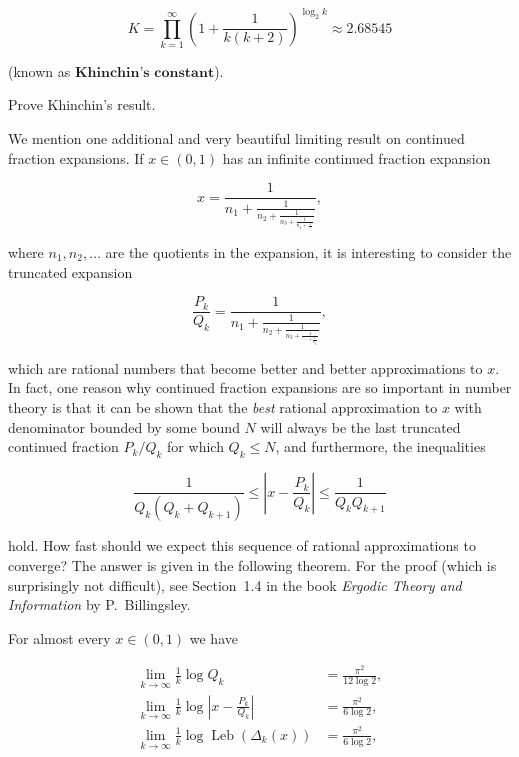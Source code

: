 \begin{enumerate}[label=\arabic*.]
\[
K = \prod_{k=1}^\infty \left( 1+\frac{1}{k(k+2)} \right)^{\log_2 k} \approx 2.68545
\]

\noindent (known as $\textbf{Khinchin's constant}$).

\begin{xexercise}
Prove Khinchin's result.
\end{xexercise}

\noindent We mention one additional and very beautiful limiting
result on continued fraction expansions. If
$x\in (0,1)$ has an infinite continued fraction
expansion

\[
x = \frac{1}{n_1+\frac{1}{n_2+\frac{1}{n_3+\frac{1}{n_4+\frac{1}{\ldots}}}}},
\]

\noindent where $n_1,n_2,\ldots$ are the quotients in the
expansion, it is interesting to consider the truncated
expansion

\[
\frac{P_k}{Q_k} = \frac{1}{n_1+\frac{1}{n_2+\frac{1}{n_3+\frac{1}{\ddots+\frac{1}{n_k}}}}},
\]

\noindent which are rational numbers that become better and
better approximations to $x$. In fact, one reason why
continued fraction expansions are so important in
number theory is that it can be shown that the \emph{best}
rational approximation to $x$ with denominator
bounded by some bound $N$ will always be the last
truncated continued fraction $P_k/Q_k$ for which
$Q_k\le N$, and furthermore, the inequalities

\begin{equation*} \tag{22}\label{eq:cont-frac-approx}
\frac{1}{Q_k (Q_k+Q_{k+1})} \le \left|x - \frac{P_k}{Q_k} \right| \le \frac{1}{Q_k Q_{k+1}}
\end{equation*}

\noindent hold. How fast should we expect this sequence of
rational approximations to converge? The answer is
given in the following theorem. For the proof (which
is surprisingly not difficult), see Section~1.4 in the
book \emph{Ergodic Theory and Information} by P.\
Billingsley.

\begin{thm}
For almost every $x\in (0,1)$ we have

\begin{align*}
\lim_{k\to\infty} \frac{1}{k}\log Q_k &= \tag{23}\label{eq:cont-frac-entropy1} \frac{\pi^2}{12\log 2},
\\
\lim_{k\to\infty} \frac{1}{k}\log \left| x-\frac{P_k}{Q_k} \right| &= \tag{24}\label{eq:cont-frac-entropy2} \frac{\pi^2}{6\log 2},
\\
\lim_{k\to\infty} \frac{1}{k}\log \operatorname{Leb}(\Delta_k(x)) &= \tag{25}\label{eq:cont-frac-entropy3} \frac{\pi^2}{6\log 2},
\end{align*}


\end{thm}
\end{enumerate}
